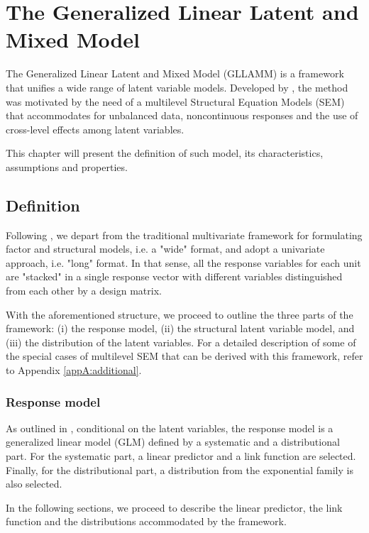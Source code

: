 \chapter{The Generalized Linear Latent and Mixed Model} \label{chap:framework}

The Generalized Linear Latent and Mixed Model (GLLAMM) is a framework that unifies a wide range of latent variable models. Developed by \citet{Rabe_et_al_2004a, Rabe_et_al_2004b Skrondal_et_al_2004}, the method was motivated by the need of a multilevel Structural Equation Models (SEM) that accommodates for unbalanced data, noncontinuous responses and the use of cross-level effects among latent variables. 

This chapter will present the definition of such model, its characteristics, assumptions and properties.


\section{Definition}
Following \citet{Rabe_et_al_2004a}, we depart from the traditional multivariate framework for formulating factor and structural models, i.e. a "wide" format, and adopt a univariate approach, i.e. "long" format. In that sense, all the response variables for each unit are "stacked" in a single response vector with different variables distinguished from each other by a design matrix.

With the aforementioned structure, we proceed to outline the three parts of the framework: (i) the response model, (ii) the structural latent variable model, and (iii) the distribution of the latent variables. For a detailed description of some of the special cases of multilevel SEM that can be derived with this framework, refer to Appendix \ref{appA:additional}.


\subsection{Response model}
As outlined in \citet{Rabe_et_al_2004a, Rabe_et_al_2012}, conditional on the latent variables, the response model is a generalized linear model (GLM) defined by a systematic and a distributional part. For the systematic part, a linear predictor and a link function are selected. Finally, for the distributional part, a distribution from the exponential family is also selected. 

In the following sections, we proceed to describe the linear predictor, the link function and the distributions accommodated by the framework.


